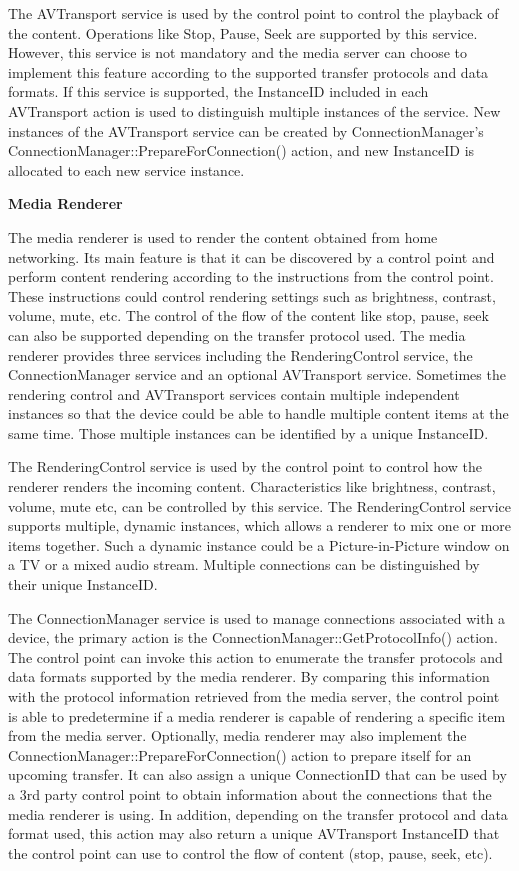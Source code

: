 The AVTransport service is used by the control point to control the playback of the 
content. Operations like Stop, Pause, Seek are supported by this service. However, this 
service is not mandatory and the media server can choose to implement this feature 
according to the supported transfer protocols and data formats. If this service 
is supported, the InstanceID included in each AVTransport action is used to 
distinguish multiple instances of the service. New instances of the AVTransport 
service can be created by ConnectionManager's 
ConnectionManager::PrepareForConnection() action, and new InstanceID is 
allocated to each new service instance. 

\textbf{Media Renderer} 

The media renderer is used to render the content obtained from home 
networking. Its main feature is that it can be discovered by a control point and perform content rendering according to the instructions from the control point. These instructions could control rendering settings such as brightness, contrast, volume, mute, etc. The control of the flow of the content like stop, pause, seek can also be supported depending on the transfer protocol used. The media 
renderer provides three services including the RenderingControl service, the ConnectionManager 
service and an optional AVTransport service. Sometimes the rendering control and 
AVTransport services contain multiple independent instances so that the device 
could be able to handle multiple content items at the same time. Those multiple 
instances can be identified by a unique InstanceID.

The RenderingControl service is used by the control point to control how the renderer 
renders the incoming content. Characteristics like brightness, contrast, 
volume, mute etc, can be controlled by this service. The RenderingControl service 
supports multiple, dynamic instances, which allows a renderer to mix one or 
more items together. Such a dynamic instance could be a Picture-in-Picture
window on a TV or a mixed audio stream. Multiple connections can be
distinguished by their unique InstanceID. 

The ConnectionManager service is used to manage connections associated with a 
device, the primary action is the ConnectionManager::GetProtocolInfo() action. 
The control point can invoke this action to enumerate the transfer protocols and 
data formats supported by the media renderer. By comparing this information with 
the protocol information retrieved from the media server, the control point is able to 
predetermine if a media renderer is capable of rendering a specific item from 
the media server. Optionally, media renderer may also implement the
ConnectionManager::PrepareForConnection() action to prepare itself for an 
upcoming transfer. It can also assign a unique ConnectionID that can be used by 
a 3rd party control point to obtain information about the connections that the media 
renderer is using. In addition, depending on the transfer protocol and data 
format used, this action may also return a unique AVTransport InstanceID that the control 
point can use to control the flow of content (stop, pause, seek, etc). 

